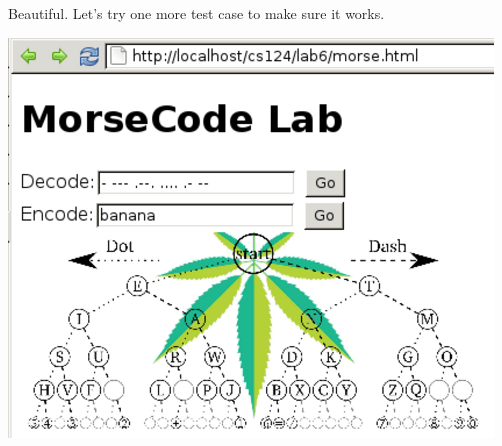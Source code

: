 Beautiful. Let's try one more test case to make sure it works.

 
    \includegraphics{../test91.png}
     